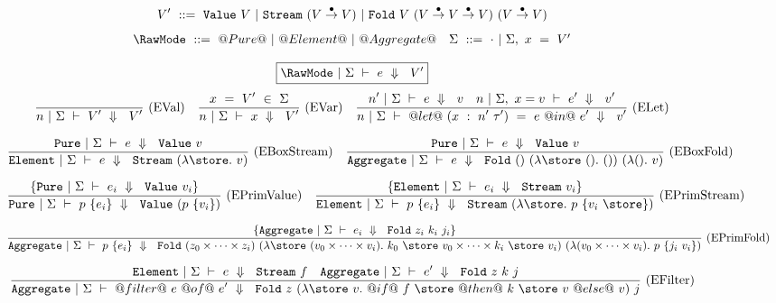 
\begin{figure*}
$$
V'~     ::=~\VValue{V}
        ~|~\VStream {(V \stackrel{\bullet}{\to} V)}
        ~|~\VFold{V}{(V \stackrel{\bullet}{\to} V \stackrel{\bullet}{\to} V)}
                    {(V \stackrel{\bullet}{\to} V)}
$$
$$
\begin{array}{ll}

\RawMode~::=~@Pure@~|~@Element@~|~@Aggregate@

&

\Sigma~::=~\cdot~|~\Sigma,~x~=~V'

\end{array}
$$

  \scriptsize


$$
\boxed{\SourceStepX{\RawMode}{\Sigma}{e}{V'}}
$$
$$
\enskip \frac {\displaystyle } {\displaystyle 
    n~|~\Sigma~\vdash~V'~\Downarrow~~V'
} \  \mbox{(EVal)} \enskip
\enskip \frac {\displaystyle 
    x~=~V'~\in~\Sigma
} {\displaystyle 
    n~|~\Sigma~\vdash~x~\Downarrow~~V'
} \  \mbox{(EVar)} \enskip
\enskip \frac {\displaystyle 
  n'~|~\Sigma~\vdash~e~\Downarrow~~v
  \quad
  n~|~\Sigma,~x=v~\vdash~e'~\Downarrow~~v'
} {\displaystyle 
  n~|~\Sigma~\vdash~@let@~(x~:~n'~\tau')~=~e~@in@~e'~\Downarrow~~v'
} \  \mbox{(ELet)} \enskip
$$

$$
\ruleIN
{
    \SourceStepXP{\Sigma}{e}{\VValue{v}}
}
{
    \SourceStepXE{\Sigma}{e}{\VStream{(\lam{\store} v)}}
}{EBoxStream}
\ruleIN
{
    \SourceStepXP{\Sigma}{e}{\VValue{v}}
}
{
    \SourceStepXA{\Sigma}{e}{\VFold{()}{(\lam{\store~()} ())}{(\lam{()} v)}}
}{EBoxFold}
$$

$$
\ruleIN
{
  \{ \SourceStepXP{\Sigma}{e_i}{\VValue{v_i}} \}
}
{
  \SourceStepXP
    {\Sigma}
    {p~\{ e_i \} }
    {\VValue{(p~\{v_i\})}}
}{EPrimValue}
\ruleIN
{
  \{ \SourceStepXE{\Sigma}{e_i}{\VStream{v_i}} \}
}
{
  \SourceStepXE
    {\Sigma}
    {p~\{ e_i \} }
    {\VStream{(\lam{\store} p~\{v_i~\store\})}}
}{EPrimStream}
$$

$$
\ruleIN
{
  \{ \SourceStepXA{\Sigma}{e_i}{\VFold{z_i}{k_i}{j_i}} \}
}
{
  \SourceStepXA{\Sigma}
    {p~\{ e_i \} }
    {\VFold
      {(z_0 \times \cdots \times z_i)}
      {(\lam{\store~(v_0 \times \cdots \times v_i)}
        k_0~\store~v_0 \times \cdots \times k_i~\store~v_i)}
      {(\lam{(v_0 \times \cdots \times v_i)}
        p~\{j_i~v_i\})}}
}{EPrimFold}
$$

$$
\ruleIN
{
  \SourceStepXE{\Sigma}{e}{\VStream{f}}
  \quad
  \SourceStepXA{\Sigma}{e'}{\VFold{z}{k}{j}}
}
{
  \SourceStepXA{\Sigma}
    {@filter@~e~@of@~e'}
    {\VFold
      {z}
      {(\lam{\store~v}
         @if@~f~\store~@then@~k~\store~v~@else@~v)}
      {j}}
}{EFilter}
$$


\end{figure*}
